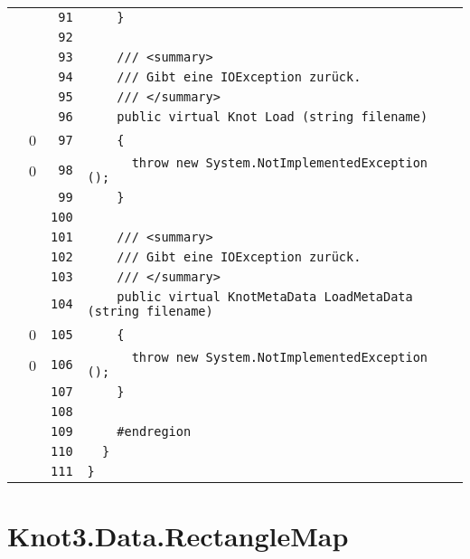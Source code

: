 \documentclass[a4paper,10pt]{article}
\begin{document}
\begin{longtable}[l]{lrrl}
\cellcolor{gray} &  & \verb~91~ & \verb~    }~\\
\cellcolor{gray} &  & \verb~92~ & \verb~~\\
\cellcolor{gray} &  & \verb~93~ & \verb~    /// <summary>~\\
\cellcolor{gray} &  & \verb~94~ & \verb~    /// Gibt eine IOException zurück.~\\
\cellcolor{gray} &  & \verb~95~ & \verb~    /// </summary>~\\
\cellcolor{gray} &  & \verb~96~ & \verb~    public virtual Knot Load (string filename)~\\
\cellcolor{red} & 0 & \verb~97~ & \verb~    {~\\
\cellcolor{red} & 0 & \verb~98~ & \verb~      throw new System.NotImplementedException ();~\\
\cellcolor{gray} &  & \verb~99~ & \verb~    }~\\
\cellcolor{gray} &  & \verb~100~ & \verb~~\\
\cellcolor{gray} &  & \verb~101~ & \verb~    /// <summary>~\\
\cellcolor{gray} &  & \verb~102~ & \verb~    /// Gibt eine IOException zurück.~\\
\cellcolor{gray} &  & \verb~103~ & \verb~    /// </summary>~\\
\cellcolor{gray} &  & \verb~104~ & \verb~    public virtual KnotMetaData LoadMetaData (string filename)~\\
\cellcolor{red} & 0 & \verb~105~ & \verb~    {~\\
\cellcolor{red} & 0 & \verb~106~ & \verb~      throw new System.NotImplementedException ();~\\
\cellcolor{gray} &  & \verb~107~ & \verb~    }~\\
\cellcolor{gray} &  & \verb~108~ & \verb~~\\
\cellcolor{gray} &  & \verb~109~ & \verb~    #endregion~\\
\cellcolor{gray} &  & \verb~110~ & \verb~  }~\\
\cellcolor{gray} &  & \verb~111~ & \verb~}~\\
\end{longtable}
\newpage
\section{Knot3.Data.RectangleMap}
\end{document}
